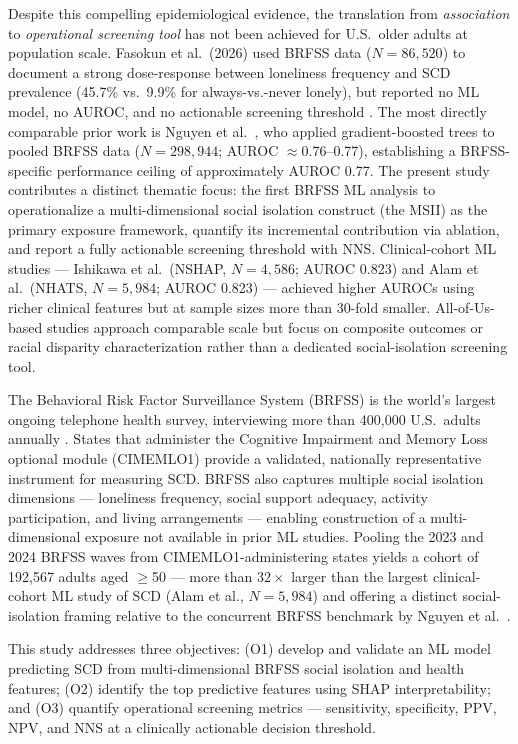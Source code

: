 \documentclass[12pt,a4paper]{article}
\begin{document}
Despite this compelling epidemiological evidence, the translation from
\textit{association} to \textit{operational screening tool} has not been achieved
for U.S.\ older adults at population scale. Fasokun et al.\ (2026) used BRFSS
data ($N = 86{,}520$) to document a strong dose-response between loneliness
frequency and SCD prevalence (45.7\% vs.\ 9.9\% for always-vs.-never lonely),
but reported no ML model, no AUROC, and no actionable screening threshold
\cite{Fasokun2026}. The most directly comparable prior work is Nguyen et al.\ \cite{Nguyen2026}, who applied gradient-boosted trees to pooled BRFSS data ($N = 298{,}944$; AUROC $\approx$0.76--0.77), establishing a BRFSS-specific performance ceiling of approximately AUROC 0.77. The present study contributes a distinct thematic focus: the first BRFSS ML analysis to operationalize a multi-dimensional social isolation construct (the MSII) as the primary exposure framework, quantify its incremental contribution via ablation, and report a fully actionable screening threshold with NNS. Clinical-cohort ML studies --- Ishikawa et al.\ (NSHAP, $N = 4{,}586$; AUROC 0.823) \cite{Ishikawa2025} and Alam et al.\ (NHATS, $N = 5{,}984$; AUROC 0.823) \cite{Alam2026} --- achieved higher AUROCs using richer clinical features but at sample sizes more than 30-fold smaller. All-of-Us-based studies \cite{Dong2025,KammerKerwick2026} approach comparable scale but focus on composite outcomes or racial disparity characterization rather than a dedicated social-isolation screening tool.

The Behavioral Risk Factor Surveillance System (BRFSS) is the world's largest
ongoing telephone health survey, interviewing more than 400,000 U.S.\ adults
annually \cite{CDC_BRFSS}. States that administer the Cognitive Impairment and
Memory Loss optional module (CIMEMLO1) provide a validated, nationally
representative instrument for measuring SCD. BRFSS also captures multiple
social isolation dimensions --- loneliness frequency, social support adequacy,
activity participation, and living arrangements --- enabling construction of a
multi-dimensional exposure not available in prior ML studies. Pooling the 2023
and 2024 BRFSS waves from CIMEMLO1-administering states yields a cohort of
192,567 adults aged $\geq$50 --- more than $32\times$ larger than the largest clinical-cohort ML study of SCD (Alam et al., $N = 5{,}984$) \cite{Alam2026} and offering a distinct social-isolation framing relative to the concurrent BRFSS benchmark by Nguyen et al.\ \cite{Nguyen2026}.

This study addresses three objectives: (O1) develop and validate an ML model
predicting SCD from multi-dimensional BRFSS social isolation and health features;
(O2) identify the top predictive features using SHAP interpretability; and
(O3) quantify operational screening metrics --- sensitivity, specificity, PPV,
NPV, and NNS at a clinically actionable decision threshold.
\end{document}
